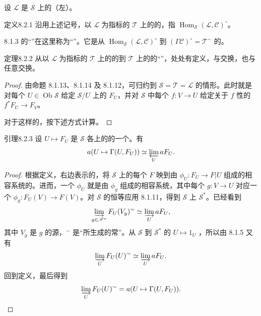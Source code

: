 设 $\mathscr L$ 是 $\mathscr S$ 上的（左）。
\begin{SGAresult}{定义}{8.2.1}
沿用上述记号，以 $\mathscr L$ 为指标的 $\mathscr T$ 上的的，指 $\operatorname{Hom}_{\mathscr S}(\mathscr L,\mathscr C)^\circ$。
\end{SGAresult}
8.1.3 的“”在这里称为“”。它是从 $\operatorname{Hom}_{\mathscr S}(\mathscr L,\mathscr C)^\circ$ 到 $(\Gamma\mathscr C)^\circ=\mathscr T^{\sim}$ 的。
\begin{SGAresult}{定理}{8.2.2}
从以 $\mathscr L$ 为指标的 $\mathscr T$ 上的的到 $\mathscr T$ 上的的“”，处处有定义，与交换，也与任意交换。
\end{SGAresult}
\begin{proof}
由命题 8.1.13、8.1.14 及 8.1.12，可归约到 $\mathscr S=\mathscr T=\mathscr L$ 的情形。此时就是对每个 $U\in\operatorname{Ob}\mathscr S$ 给定 $\mathscr S/U$ 上的 $F_U$，并对 $\mathscr S$ 中每个 $f:V\to U$ 给定关于 $f$ 性的 $f^*F_U\to F_V$。

对于这样的，按下述方式计算。
\end{proof}
\begin{SGAresult}{引理}{8.2.3}
设 $U\mapsto F_U$ 是 $\mathscr S$ 各上的的一个。有
\[a(U\mapsto\Gamma(U,F_U))\simeq\varprojlim_U aF_U.\]
\end{SGAresult}
\begin{proof}
根据定义，右边表示的，将 $\mathscr S$ 上的每个 $F$ 映到由 $\phi_U:F_U\to F|U$ 组成的相容系统的。进而，一个 $\phi_U$ 就是由 $\phi_g$ 组成的相容系统，其中每个 $g:V\to U$ 对应一个 $\phi_g:F_U(V)\to F(V)$。对 $\mathscr S$ 的恒等应用 8.1.11，得到 $\mathscr S$ 上 $\mathscr S^*$。已经看到
\[\varinjlim_{g\in\mathscr S^*}F_U(V_g)^{\sim}\simeq\varinjlim_UaF_U,\]
其中 $V_g$ 是 $g$ 的源，${}^{\sim}$ 是“所生成的常”。从 $\mathscr S$ 到 $\mathscr S^*$ 的 $U\mapsto1_U$ ，所以由 8.1.5 又有
\[\varinjlim_UF_U(U)^{\sim}\simeq\varinjlim_UaF_U.\]
回到定义，最后得到
\[\varinjlim_UF_U(U)^{\sim}=a(U\mapsto\Gamma(U,F_U)).\]
\end{proof}

